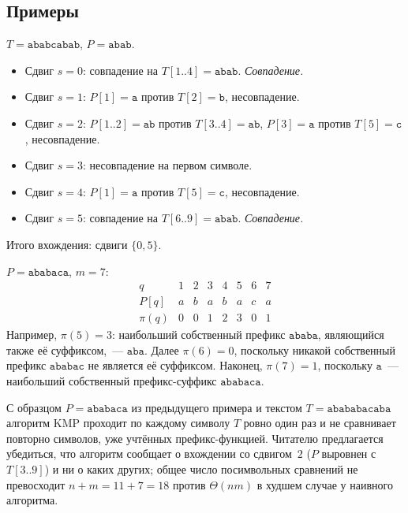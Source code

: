 \subsection*{Примеры}

\begin{example}
\label{ex:naive-search}
$T = \texttt{ababcabab}$, $P = \texttt{abab}$.
\begin{itemize}
  \item Сдвиг $s = 0$: совпадение на $T[1..4] = \texttt{abab}$.
        \emph{Совпадение.}
  \item Сдвиг $s = 1$: $P[1] = \texttt{a}$ против $T[2] = \texttt{b}$,
        несовпадение.
  \item Сдвиг $s = 2$: $P[1..2] = \texttt{ab}$ против
        $T[3..4] = \texttt{ab}$, $P[3] = \texttt{a}$ против
        $T[5] = \texttt{c}$, несовпадение.
  \item Сдвиг $s = 3$: несовпадение на первом символе.
  \item Сдвиг $s = 4$: $P[1] = \texttt{a}$ против $T[5] = \texttt{c}$,
        несовпадение.
  \item Сдвиг $s = 5$: совпадение на $T[6..9] = \texttt{abab}$.
        \emph{Совпадение.}
\end{itemize}
Итого вхождения: сдвиги $\{0, 5\}$.
\end{example}

\begin{example}
\label{ex:prefix-function}
$P = \texttt{ababaca}$, $m = 7$:
\[
  \begin{array}{r|ccccccc}
    q       & 1 & 2 & 3 & 4 & 5 & 6 & 7 \\
    \hline
    P[q]    & a & b & a & b & a & c & a \\
    \pi(q)  & 0 & 0 & 1 & 2 & 3 & 0 & 1
  \end{array}
\]
Например, $\pi(5) = 3$: наибольший собственный префикс
$\texttt{ababa}$, являющийся также её суффиксом,~--- $\texttt{aba}$.
Далее $\pi(6) = 0$, поскольку никакой собственный префикс
$\texttt{ababac}$ не является её суффиксом. Наконец, $\pi(7) = 1$,
поскольку $\texttt{a}$~--- наибольший собственный префикс-суффикс
$\texttt{ababaca}$.
\end{example}

\begin{example}
\label{ex:kmp-run}
С образцом $P = \texttt{ababaca}$ из предыдущего примера и текстом
$T = \texttt{abababacaba}$ алгоритм KMP проходит по каждому символу
$T$ ровно один раз и не сравнивает повторно символов, уже учтённых
префикс-функцией. Читателю предлагается убедиться, что алгоритм
сообщает о вхождении со сдвигом~$2$ ($P$ выровнен с $T[3..9]$) и
ни о каких других; общее число посимвольных сравнений не превосходит
$n + m = 11 + 7 = 18$ против $\Theta(nm)$ в худшем случае у наивного
алгоритма.
\end{example}

